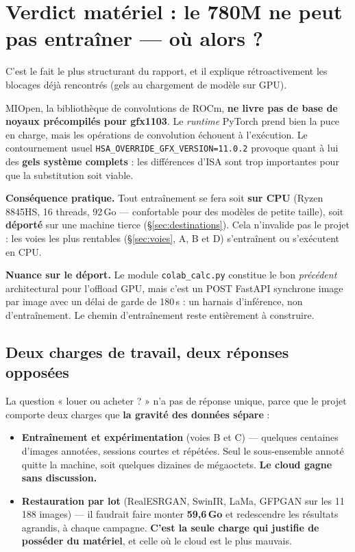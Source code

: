 \documentclass[11pt,a4paper]{article}
\newcommand{\aretenir}[1]{%
  \par\medskip
  \noindent\colorbox{encadre}{%
    \begin{minipage}{\dimexpr\linewidth-2\fboxsep}
      \vspace{2pt}#1\vspace{2pt}
    \end{minipage}}%
  \par\medskip
}
\newcommand{\alerte}[1]{\textcolor{alerte}{\textbf{#1}}}
\begin{document}
\section{Verdict matériel : le 780M ne peut pas entraîner --- où alors ?}

C'est le fait le plus structurant du rapport, et il explique rétroactivement les
blocages déjà rencontrés (gels au chargement de modèle sur GPU).

MIOpen, la bibliothèque de convolutions de ROCm, \textbf{ne livre pas de base de
noyaux précompilés pour gfx1103}. Le \emph{runtime} PyTorch prend bien la puce en
charge, mais les opérations de convolution échouent à l'exécution. Le
contournement usuel \texttt{HSA\_OVERRIDE\_GFX\_VERSION=11.0.2} provoque quant à
lui des \textbf{gels système complets} : les différences d'ISA sont trop
importantes pour que la substitution soit viable.

\aretenir{\textbf{Conséquence pratique.} Tout entraînement se fera soit
\textbf{sur CPU} (Ryzen 8845HS, 16 threads, 92\,Go — confortable pour des modèles
de petite taille), soit \textbf{déporté} sur une machine tierce
(§\ref{sec:destinations}). Cela n'invalide pas le projet : les voies les plus
rentables (§\ref{sec:voies}, A, B et D) s'entraînent ou s'exécutent en CPU.}

\textbf{Nuance sur le déport.} Le module \texttt{colab\_calc.py} constitue le bon
\emph{précédent} architectural pour l'offload GPU, mais c'est un POST FastAPI
synchrone image par image avec un délai de garde de 180\,s : un harnais
d'inférence, non d'entraînement. Le chemin d'entraînement reste entièrement à
construire.

\subsection{Deux charges de travail, deux réponses opposées}
\label{sec:charges}

La question « louer ou acheter ? » n'a pas de réponse unique, parce que le projet
comporte deux charges que \textbf{la gravité des données sépare} :

\begin{itemize}[leftmargin=*,itemsep=4pt]
  \item \textbf{Entraînement et expérimentation} (voies B et C) — quelques
  centaines d'images annotées, sessions courtes et répétées. Seul le
  sous-ensemble annoté quitte la machine, soit quelques dizaines de mégaoctets.
  \alerte{Le cloud gagne sans discussion.}
  \item \textbf{Restauration par lot} (RealESRGAN, SwinIR, LaMa, GFPGAN sur les
  11\,188 images) — il faudrait faire monter \textbf{59,6\,Go} et redescendre les
  résultats agrandis, à chaque campagne. \alerte{C'est la seule charge qui
  justifie de posséder du matériel}, et celle où le cloud est le plus mauvais.
\end{itemize}
\end{document}
